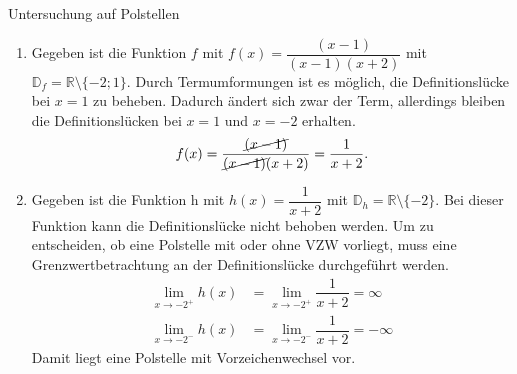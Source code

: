 \begin{bsp}{Untersuchung auf Polstellen}{}
\begin{enumerate}
     \item Gegeben ist die Funktion $f$ mit $f(x) = \dfrac{(x-1)}{(x-1)(x+2)}$ mit $\mathds{D}_f = \mathds{R}\setminus\{-2; 1\}$. Durch Termumformungen ist es möglich, die Definitionslücke bei $x=1$ zu beheben. Dadurch ändert sich zwar der Term, allerdings bleiben die Definitionslücken bei $x= 1$ und $x=-2$ erhalten. $$f(x) = \dfrac{\cancel{(x-1)}}{\cancel{(x-1)}(x+2)} = \dfrac{1}{x+2}.$$
     \item Gegeben ist die Funktion h mit $h(x) = \dfrac{1}{x+2}$ mit $\mathds{D}_h = \mathds{R}\setminus\{-2\}$. Bei dieser Funktion kann die Definitionslücke nicht behoben werden. Um zu entscheiden, ob eine Polstelle mit oder ohne VZW vorliegt, muss eine Grenzwertbetrachtung an der Definitionslücke durchgeführt werden.
     \begin{equation*}
    \begin{split}
        \lim_{x\rightarrow -2^+} h(x) &= \lim_{x\rightarrow -2^+} \dfrac{1}{x+2} = \infty\\
        \lim_{x\rightarrow -2^-} h(x)&= \lim_{x\rightarrow -2^-} \dfrac{1}{x+2} = -\infty
    \end{split}
\end{equation*}
 Damit liegt eine Polstelle mit Vorzeichenwechsel vor.
 \begin{center}
\end{center}
 \end{enumerate}
 \end{bsp}

